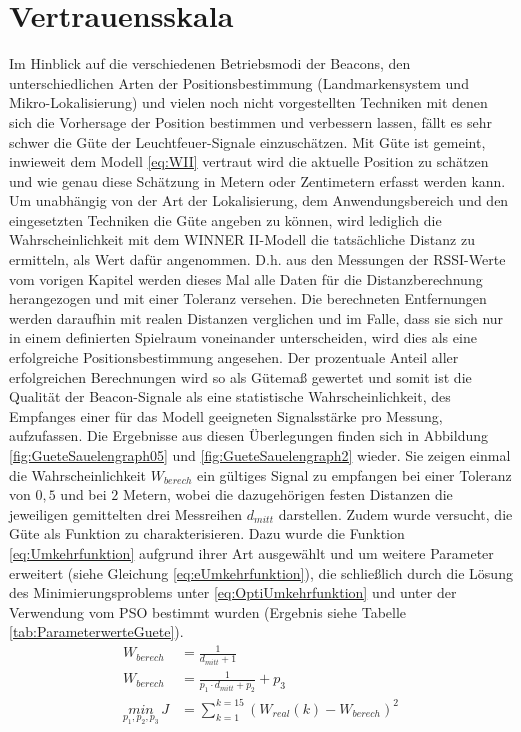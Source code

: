 \section{Vertrauensskala}
Im Hinblick auf die verschiedenen Betriebsmodi der Beacons, den unterschiedlichen Arten der Positionsbestimmung (Landmarkensystem und Mikro-Lokalisierung) und vielen noch nicht vorgestellten Techniken mit denen sich die Vorhersage der Position bestimmen und verbessern lassen, fällt es sehr schwer die Güte der Leuchtfeuer-Signale einzuschätzen. Mit Güte ist gemeint, inwieweit dem Modell \ref{eq:WII} vertraut wird die aktuelle Position zu schätzen und wie genau diese Schätzung in Metern oder Zentimetern erfasst werden kann. Um unabhängig von der Art der Lokalisierung, dem Anwendungsbereich und den eingesetzten Techniken die Güte angeben zu können, wird lediglich die Wahrscheinlichkeit mit dem WINNER II-Modell die tatsächliche Distanz zu ermitteln, als Wert dafür angenommen. D.h. aus den Messungen der RSSI-Werte vom vorigen Kapitel werden dieses Mal alle Daten für die Distanzberechnung herangezogen und mit einer Toleranz versehen. Die berechneten Entfernungen werden daraufhin mit realen Distanzen verglichen und im Falle, dass sie sich nur in einem definierten Spielraum voneinander unterscheiden, wird dies als eine erfolgreiche Positionsbestimmung angesehen. Der prozentuale Anteil aller erfolgreichen Berechnungen wird so als Gütemaß gewertet und somit ist die Qualität der Beacon-Signale als eine statistische Wahrscheinlichkeit, des Empfanges einer für das Modell geeigneten Signalsstärke pro Messung, aufzufassen. Die Ergebnisse aus diesen Überlegungen finden sich in Abbildung \ref{fig:GueteSauelengraph05} und \ref{fig:GueteSauelengraph2} wieder. Sie zeigen einmal die Wahrscheinlichkeit $W_{berech}$ ein gültiges Signal zu empfangen bei einer Toleranz von $0,5$ und bei $2$ Metern, wobei die dazugehörigen festen Distanzen die jeweiligen gemittelten drei Messreihen $d_{mitt}$ darstellen. Zudem wurde versucht, die Güte als Funktion zu charakterisieren. Dazu wurde die Funktion \ref{eq:Umkehrfunktion} aufgrund ihrer Art ausgewählt und um weitere Parameter erweitert (siehe Gleichung \ref{eq:eUmkehrfunktion}), die schließlich durch die Lösung des Minimierungsproblems unter \ref{eq:OptiUmkehrfunktion} und unter der Verwendung vom PSO bestimmt wurden (Ergebnis siehe Tabelle \ref{tab:ParameterwerteGuete}).
\begin{align}
W_{berech}&=\frac{1}{d_{mitt}+1} \label{eq:Umkehrfunktion}\\
W_{berech}&=\frac{1}{p_1\cdot d_{mitt}+p_2} + p_3 \label{eq:eUmkehrfunktion}\\
\underset{p_1,p_2,p_3}{min}\, J&=\sum_{k=1}^{k=15}\left ( W_{real}\left ( k \right ) - W_{berech} \right )^{2} \label{eq:OptiUmkehrfunktion}
\end{align}
